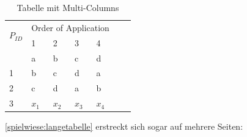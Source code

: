 \begin{table}[!t]
    \centering
    \caption{Tabelle mit Multi-Columns}
    \label{spielwiese:multicoltabelle}
    \begin{tabular}{p{1cm}llllcp{2cm}}
        \toprule%
        \multirow{2}{*}{$P_{ID}$} & \multicolumn{4}{c}{Order of Application}\\%
        \cmidrule{2-5}%
        {} & 1 & 2 & 3 & 4\\%
        \midrule%
        \addlinespace
        0 & a & b & c & d\\%
        1 & b & c & d & a\\%
        2 & c & d & a & b\\%
        3 & $x_{1}$ & $x_{2}$ & $x_{3}$ & $x_{4}$\\%
        \bottomrule%
    \end{tabular}
\end{table}


\autoref{spielwiese:langetabelle} erstreckt sich sogar auf mehrere Seiten:

